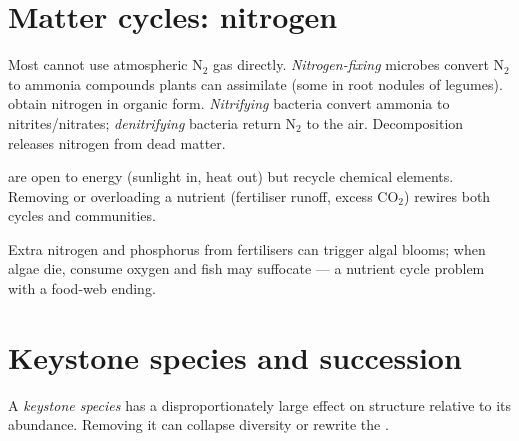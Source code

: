 \section{Matter cycles: nitrogen}

\begin{definition}\label{def:g10:ecosystems:nitrogen}
Most  cannot use atmospheric $\mathrm{N_2}$ gas directly.
\emph{Nitrogen-fixing} microbes convert
$\mathrm{N_2}$ to ammonia compounds plants can assimilate (some in
root nodules of legumes).  obtain nitrogen in organic form.
\emph{Nitrifying} bacteria convert ammonia to
nitrites/nitrates; \emph{denitrifying} bacteria
return $\mathrm{N_2}$ to the air. Decomposition releases nitrogen from
dead matter.
\end{definition}

\begin{proposition}\label{prop:g10:ecosystems:flow-cycle}
 are open to energy (sunlight in, heat out) but recycle
chemical elements. Removing or overloading a nutrient (fertiliser runoff,
excess $\mathrm{CO_2}$) rewires both cycles and communities.
\end{proposition}
\admitted

\begin{example}\label{ex:g10:ecosystems:eutro}
Extra nitrogen and phosphorus from fertilisers can trigger algal blooms;
when algae die,  consume oxygen and fish may suffocate --- a
nutrient cycle problem with a food-web ending.
\end{example}

\section{Keystone species and succession}

\begin{definition}\label{def:g10:ecosystems:keystone}
A \emph{keystone species} has a disproportionately
large effect on  structure relative to its abundance. Removing it
can collapse diversity or rewrite the .
\end{definition}

